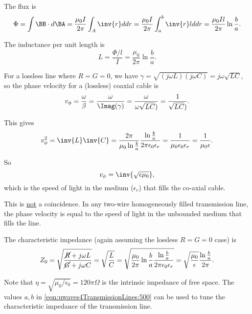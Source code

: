 {The flux is
\begin{dmath}\label{eqn:uwaves4TransmissionLines:400}
\Phi
= \int \BB \cdot d\BA
= \frac{\mu_0 I}{ 2 \pi } \int_A \inv{r} d dr
= \frac{\mu_0 I}{ 2 \pi } \int_a^b \inv{r} l d dr
= \frac{\mu_0 I l}{ 2 \pi } \ln \frac{b}{a}.
\end{dmath}

The inductance per unit length is
\begin{equation}\label{eqn:uwaves4TransmissionLines:420}
L = \frac{\Phi/l}{I} = \frac{\mu_0}{ 2 \pi } \ln \frac{b}{a}.
\end{equation}


For a lossless line where \( R = G = 0 \), we have \( \gamma = \sqrt{ (j \omega L)(j \omega C)} = j \omega \sqrt{L C} \),
so the phase velocity for a (lossless) coaxial cable is
\begin{dmath}\label{eqn:uwaves4TransmissionLines:440}
v_\phi
= \frac{\omega}{\beta}
= \frac{\omega}{\Imag(\gamma)}
= \frac{\omega}{\omega \sqrt{LC})}
= \frac{1}{\sqrt{LC})}.
\end{dmath}

This gives
\begin{dmath}\label{eqn:uwaves4TransmissionLines:460}
v_\phi^2
= \inv{ L }  \inv{C}
=
\frac{ 2 \pi }{ \mu_0 \ln \frac{b}{a} }
\frac
{\ln \frac{b}{a}}
{2 \pi \epsilon_0 \epsilon_r }
=
\frac{1 }{ \mu_0 \epsilon_0 \epsilon_r }
=
\frac{1 }{ \mu_0 \epsilon }.
\end{dmath}

So
\begin{dmath}\label{eqn:uwaves4TransmissionLines:480}
v_\phi = \inv{\sqrt{\epsilon \mu_0}},
\end{dmath}
which is the speed of light in the medium (\(\epsilon_r\)) that fills the co-axial cable.

This is \underline{not} a coincidence.  In any two-wire homogeneously filled transmission line, the phase velocity is equal to the speed of light in the unbounded medium that fills the line.

The characteristic impedance (again assuming the lossless \( R = G = 0 \) case) is
\begin{dmath}\label{eqn:uwaves4TransmissionLines:500}
Z_0
= \sqrt{ \frac{\cancel{R} + j \omega L}{\cancel{G} + j \omega C} }
= \sqrt{ \frac{L}{C} }
= \sqrt{
\frac{\mu_0}{ 2 \pi } \ln \frac{b}{a}
\frac{ \ln \frac{b}{a} }
{2 \pi \epsilon_0 \epsilon_r }
}
=
\sqrt{ \frac{\mu_0}{\epsilon} } \frac{ \ln \frac{b}{a} }{ 2 \pi }.
\end{dmath}

Note that \( \eta = \sqrt{\mu_0/\epsilon_0} = 120 \pi \Omega \) is the intrinsic impedance of free space.  The values \( a, b \) in \cref{eqn:uwaves4TransmissionLines:500} can be used to tune the characteristic impedance of the transmission line.
} %
